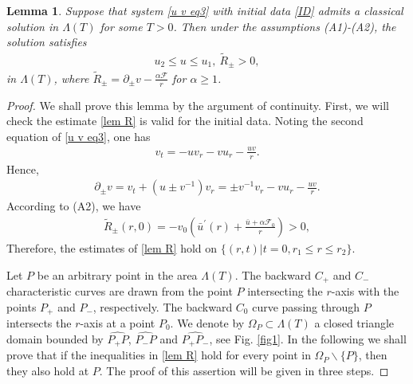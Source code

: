 \documentclass[10pt,leqno]{amsart}
\numberwithin{equation}{section}
\newtheorem{lem}{Lemma}[section]
\begin{document}
\begin{lem} \label{lem u c prop}
	Suppose that system \eqref{u v eq3} with initial data \eqref{ID} admits a classical solution in $ \Lambda (T)$ for some $T>0$. Then under the assumptions (A1)-(A2), the solution satisfies 
	\begin{equation} \label{lem R}
		\begin{aligned}
			u_2 \leq u \leq u_1, \ \tilde{R}_{\pm} > 0 ,
		\end{aligned}
	\end{equation}	
	in $\Lambda (T)$, where $	\tilde{R}_{\pm} = \partial_{\pm} v - \frac{\alpha\mathcal{F}}{r}$ for $\alpha \geq 1$.
\end{lem}


\begin{proof}
	We shall prove this lemma by the argument of continuity. First, we will check the estimate \eqref{lem R} is valid for the initial data. Noting the second equation of \eqref{u v eq3}, one has
	\begin{equation*} 
		\begin{aligned}
			v_{t} = -uv_{r} - vu_r-\frac{uv}{r}.
		\end{aligned}
	\end{equation*}	
	Hence,
	\begin{equation*} 
		\begin{aligned}
			\partial_{\pm} v  = v_{t} + (u \pm v^{-1}) v_{r}  = \pm v^{-1} v_{r} - vu_r-\frac{uv}{r}.
		\end{aligned}
	\end{equation*}	
	According to (A2), we have
	\begin{equation*} 
		\begin{aligned}
			\tilde{R}_{\pm}(r,0) =  -v_0 \left(   \bar{u}^{\prime}(r) + \frac{\bar{u} + \alpha \mathcal{F}_{0}}{r} \right) >0 ,
		\end{aligned}
	\end{equation*}	
	Therefore, the estimates of \eqref{lem R} hold on $\{(r,t)|t=0, r_1 \leq r \leq r_2 \}$.
	
	
	Let $P$ be an arbitrary point in the area $\Lambda (T)$. The backward $C_{+}$ and $C_{-}$ characteristic curves are drawn from the point $P$ intersecting the $r$-axis with the points $P_{+}$ and $P_{-}$, respectively. The backward $C_{0}$ curve passing through $P$ intersects the $r$-axis at a point $P_{0}$. We denote by $\Omega_{P}\subset \Lambda (T)$ a closed triangle domain
	bounded by $\widehat{P_{+} P}$, $\widehat{P_{-} P}$	and $\widehat{P_{+} P_{-}}$, see Fig. \ref{fig1}. In the following we shall prove that if the inequalities in \eqref{lem R} hold
	for every point in $\Omega_{P} \backslash \{P\}$, then they also hold at $P$. The proof of this assertion will be given in three steps.
	

\end{proof}
\end{document}
